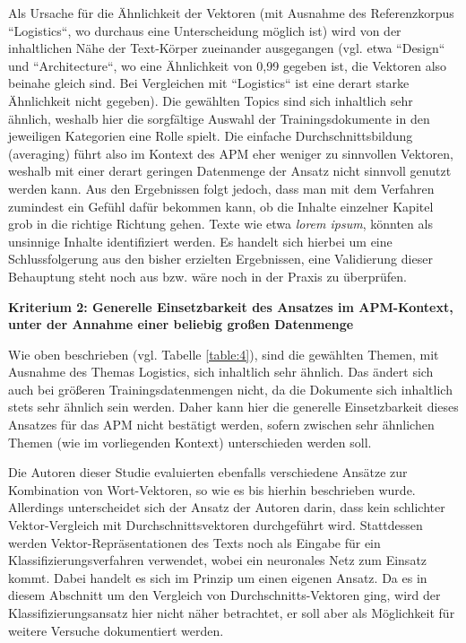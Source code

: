 Als Ursache für die Ähnlichkeit der Vektoren (mit Ausnahme des Referenzkorpus ``Logistics``, wo durchaus eine Unterscheidung möglich ist) wird von der inhaltlichen Nähe der Text-Körper zueinander ausgegangen (vgl. etwa ``Design`` und ``Architecture``, wo eine Ähnlichkeit von 0,99 gegeben ist, die Vektoren also beinahe gleich sind. Bei Vergleichen mit ``Logistics`` ist eine derart starke Ähnlichkeit nicht gegeben). Die gewählten Topics sind sich inhaltlich sehr ähnlich, weshalb hier die sorgfältige Auswahl der Trainingsdokumente in den jeweiligen Kategorien eine Rolle spielt. Die einfache Durchschnittsbildung (averaging) führt also im Kontext des APM eher weniger zu sinnvollen Vektoren, weshalb mit einer derart geringen Datenmenge der Ansatz nicht sinnvoll genutzt werden kann.
Aus den Ergebnissen folgt jedoch, dass man mit dem Verfahren zumindest ein Gefühl dafür bekommen kann, ob die Inhalte einzelner Kapitel grob in die richtige Richtung gehen. Texte wie etwa {\textit{lorem ipsum}}, könnten als unsinnige Inhalte identifiziert werden. Es handelt sich hierbei um eine Schlussfolgerung aus den bisher erzielten Ergebnissen, eine Validierung dieser Behauptung steht noch aus bzw. wäre noch in der Praxis zu überprüfen.

{\bf Kriterium 2: Generelle Einsetzbarkeit des Ansatzes im APM-Kontext, unter der Annahme einer beliebig großen Datenmenge}

Wie oben beschrieben (vgl. Tabelle \ref{table:4}), sind die gewählten Themen, mit Ausnahme des Themas Logistics, sich inhaltlich sehr ähnlich. Das ändert sich auch bei größeren Trainingsdatenmengen nicht, da die Dokumente sich inhaltlich stets sehr ähnlich sein werden. Daher kann hier die generelle Einsetzbarkeit dieses Ansatzes für das APM nicht bestätigt werden, sofern zwischen sehr ähnlichen Themen (wie im vorliegenden Kontext) unterschieden werden soll.

Die Autoren dieser Studie \cite{dilawar} evaluierten ebenfalls verschiedene Ansätze zur Kombination von Wort-Vektoren, so wie es bis hierhin beschrieben wurde. Allerdings unterscheidet sich der Ansatz der Autoren darin, dass kein schlichter Vektor-Vergleich mit Durchschnittsvektoren durchgeführt wird. Stattdessen werden Vektor-Repräsentationen des Texts noch als Eingabe für ein Klassifizierungsverfahren verwendet, wobei ein neuronales Netz zum Einsatz kommt. Dabei handelt es sich im Prinzip um einen eigenen Ansatz. Da es in diesem Abschnitt um den Vergleich von Durchschnitts-Vektoren ging, wird der Klassifizierungsansatz hier nicht näher betrachtet, er soll aber als Möglichkeit für weitere Versuche dokumentiert werden.


